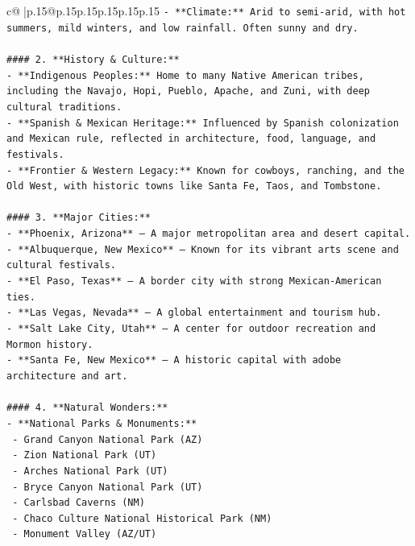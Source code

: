\documentclass{article}
\begin{document}
{\begin{supertabular}{c@{$\;$}|p{.15\linewidth}@{}p{.15\linewidth}p{.15\linewidth}p{.15\linewidth}p{.15\linewidth}p{.15\linewidth}}
{{{\texttt{{-} **Climate:** Arid to semi{-}arid, with hot summers, mild winters, and low rainfall. Often sunny and dry.} \\
\\ 
\texttt{\#\#\#\# 2. **History \& Culture:**} \\
\texttt{{-} **Indigenous Peoples:** Home to many Native American tribes, including the Navajo, Hopi, Pueblo, Apache, and Zuni, with deep cultural traditions.} \\
\texttt{{-} **Spanish \& Mexican Heritage:** Influenced by Spanish colonization and Mexican rule, reflected in architecture, food, language, and festivals.} \\
\texttt{{-} **Frontier \& Western Legacy:** Known for cowboys, ranching, and the Old West, with historic towns like Santa Fe, Taos, and Tombstone.} \\
\\ 
\texttt{\#\#\#\# 3. **Major Cities:**} \\
\texttt{{-} **Phoenix, Arizona** – A major metropolitan area and desert capital.} \\
\texttt{{-} **Albuquerque, New Mexico** – Known for its vibrant arts scene and cultural festivals.} \\
\texttt{{-} **El Paso, Texas** – A border city with strong Mexican{-}American ties.} \\
\texttt{{-} **Las Vegas, Nevada** – A global entertainment and tourism hub.} \\
\texttt{{-} **Salt Lake City, Utah** – A center for outdoor recreation and Mormon history.} \\
\texttt{{-} **Santa Fe, New Mexico** – A historic capital with adobe architecture and art.} \\
\\ 
\texttt{\#\#\#\# 4. **Natural Wonders:**} \\
\texttt{{-} **National Parks \& Monuments:**} \\
\texttt{  {-} Grand Canyon National Park (AZ)} \\
\texttt{  {-} Zion National Park (UT)} \\
\texttt{  {-} Arches National Park (UT)} \\
\texttt{  {-} Bryce Canyon National Park (UT)} \\
\texttt{  {-} Carlsbad Caverns (NM)} \\
\texttt{  {-} Chaco Culture National Historical Park (NM)} \\
\texttt{  {-} Monument Valley (AZ/UT)} \\
}}}
\end{supertabular}}
\end{document}
